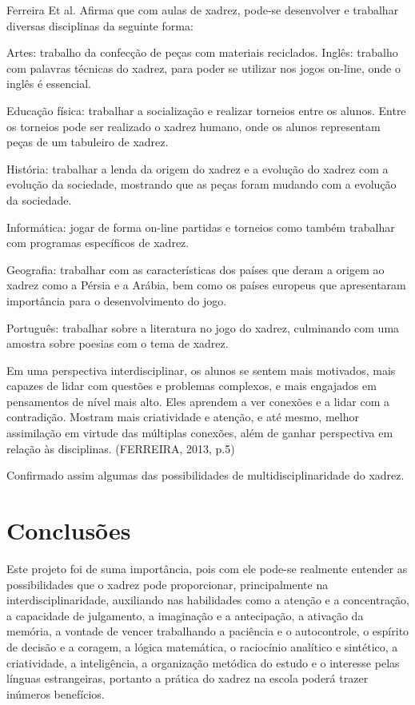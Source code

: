 \documentclass[article,12pt,onesidea,4paper,english,brazil]{abntex2}
\begin{document}
Ferreira Et al. Afirma que com aulas de xadrez, pode-se desenvolver e trabalhar diversas disciplinas da seguinte forma:
	\begin{citacao}
Artes: trabalho da confecção de peças com materiais reciclados.
Inglês: trabalho com palavras técnicas do xadrez, para poder se utilizar nos jogos on-line, onde o inglês é essencial.

Educação física: trabalhar a socialização e realizar torneios entre os alunos. Entre os torneios pode ser realizado o xadrez humano, onde os alunos representam peças de um tabuleiro de xadrez.

História: trabalhar a lenda da origem do xadrez e a evolução do xadrez com a evolução da sociedade, mostrando que as peças foram mudando com a evolução da sociedade.

Informática: jogar de forma on-line partidas e torneios como também trabalhar com programas específicos de xadrez.

Geografia: trabalhar com as características dos países que deram a origem ao xadrez como a Pérsia e a Arábia, bem como os países europeus que apresentaram importância para o desenvolvimento do jogo.

Português: trabalhar sobre a literatura no jogo do xadrez, culminando com uma amostra sobre poesias com o tema de xadrez.

Em uma perspectiva interdisciplinar, os alunos se sentem mais motivados, mais capazes de lidar com questões e problemas complexos, e mais engajados em pensamentos de nível mais alto. Eles aprendem a ver conexões e a lidar com a contradição. Mostram mais criatividade e atenção, e até mesmo, melhor assimilação em virtude das múltiplas conexões, além de ganhar perspectiva em relação às disciplinas. (FERREIRA, 2013, p.5)

	\end{citacao}
Confirmado assim algumas das possibilidades de multidisciplinaridade do xadrez.
	
	\section*{Conclusões}
	
	Este projeto foi de suma importância, pois com ele pode-se realmente entender as possibilidades que o xadrez pode proporcionar, principalmente na interdisciplinaridade, auxiliando nas habilidades como a atenção e a concentração, a capacidade de julgamento, a imaginação e a antecipação, a ativação da memória, a vontade de vencer trabalhando a paciência e o autocontrole, o espírito de decisão e a coragem, a lógica matemática, o raciocínio analítico e sintético, a criatividade, a inteligência, a organização metódica do estudo e o interesse pelas línguas estrangeiras, portanto a prática do xadrez na escola poderá trazer inúmeros benefícios.
	
\end{document}
